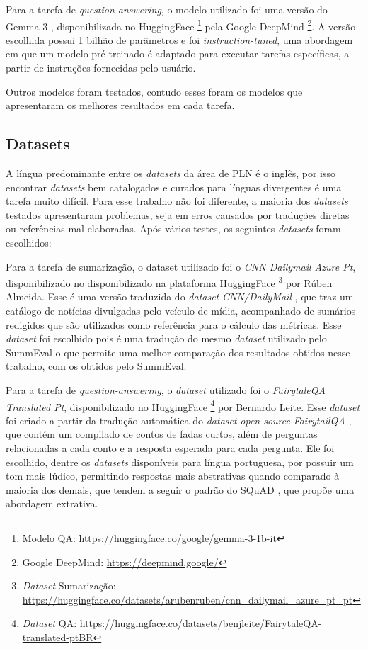 \documentclass[cic,tc]{iiufrgs}
\begin{document}
Para a tarefa de \textit{question-answering}, o modelo utilizado foi uma versão do Gemma 3 \cite{team2025gemma}, disponibilizada no HuggingFace \footnote{Modelo QA: \url{https://huggingface.co/google/gemma-3-1b-it}} pela Google DeepMind \footnote{Google DeepMind: \url{https://deepmind.google/}}. A versão escolhida possui 1 bilhão de parâmetros e foi \textit{instruction-tuned}, uma abordagem em que um modelo pré-treinado é adaptado para executar tarefas específicas, a partir de instruções fornecidas pelo usuário.

Outros modelos foram testados, contudo esses foram os modelos que apresentaram os melhores resultados em cada tarefa.

\subsection{Datasets}
\label{sec:datasets}
A língua predominante entre os \textit{datasets} da área de PLN é o inglês, por isso encontrar \textit{datasets} bem catalogados e curados para línguas divergentes é uma tarefa muito difícil. Para esse trabalho não foi diferente, a maioria dos \textit{datasets} testados apresentaram problemas, seja em erros causados por traduções diretas ou referências mal elaboradas. Após vários testes, os seguintes \textit{datasets} foram escolhidos:

Para a tarefa de sumarização, o dataset utilizado foi o \textit{CNN Dailymail Azure Pt}, disponibilizado no disponibilizado na plataforma HuggingFace \footnote{\textit{Dataset} Sumarização: \url{https://huggingface.co/datasets/arubenruben/cnn_dailymail_azure_pt_pt}} por Rúben Almeida. Esse é uma versão traduzida do \textit{dataset} \textit{CNN/DailyMail} \cite{nallapati2016abstractive}, que traz um catálogo de notícias divulgadas pelo veículo de mídia, acompanhado de sumários redigidos que são utilizados como referência para o cálculo das métricas. Esse \textit{dataset} foi escolhido pois é uma tradução do mesmo \textit{dataset} utilizado pelo SummEval \cite{fabbri2021summeval} o que permite uma melhor comparação dos resultados obtidos nesse trabalho, com os obtidos pelo SummEval.

Para a tarefa de \textit{question-answering}, o \textit{dataset} utilizado foi o \textit{FairytaleQA Translated Pt}, disponibilizado no HuggingFace \footnote{\textit{Dataset} QA: \url{https://huggingface.co/datasets/benjleite/FairytaleQA-translated-ptBR}} por Bernardo Leite. Esse \textit{dataset} foi criado a partir da tradução automática do \textit{dataset} \textit{open-source} \textit{FairytailQA} \cite{xu2022fairytaleqa}, que contém um compilado de contos de fadas curtos, além de perguntas relacionadas a cada conto e a resposta esperada para cada pergunta. Ele foi escolhido, dentre os \textit{datasets} disponíveis para língua portuguesa, por possuir um tom mais lúdico, permitindo respostas mais abstrativas quando comparado à maioria dos demais, que tendem a seguir o padrão do SQuAD \cite{rajpurkar2016squad}, que propõe uma abordagem extrativa.
\end{document}
